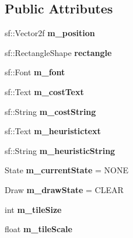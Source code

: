 \subsection*{Public Attributes}
\begin{DoxyCompactItemize}
\item 
\mbox{\label{class_tile_a5d125877d1ef0ee7618b3503db6a77e2}} 
sf\+::\+Vector2f {\bfseries m\+\_\+position}
\item 
\mbox{\label{class_tile_af967570561ac98a4ecf9d7032d709637}} 
sf\+::\+Rectangle\+Shape {\bfseries rectangle}
\item 
\mbox{\label{class_tile_a774c0efbed55d7d09bd5aeaca12836c1}} 
sf\+::\+Font {\bfseries m\+\_\+font}
\item 
\mbox{\label{class_tile_aa8a17967f5bf44cf350ada514a22de75}} 
sf\+::\+Text {\bfseries m\+\_\+cost\+Text}
\item 
\mbox{\label{class_tile_ab83a1b995bcee15701170329b8a96a7f}} 
sf\+::\+String {\bfseries m\+\_\+cost\+String}
\item 
\mbox{\label{class_tile_afff1e69b60047374a446da3e779e66c8}} 
sf\+::\+Text {\bfseries m\+\_\+heuristictext}
\item 
\mbox{\label{class_tile_a861685575cb4c0e107064ba91f336d03}} 
sf\+::\+String {\bfseries m\+\_\+heuristic\+String}
\item 
\mbox{\label{class_tile_a29e483115eaa7cac4d78504d51ea2de5}} 
State {\bfseries m\+\_\+current\+State} = N\+O\+NE
\item 
\mbox{\label{class_tile_a1ffe241b0545ed4be103b7780e6169d7}} 
Draw {\bfseries m\+\_\+draw\+State} = C\+L\+E\+AR
\item 
\mbox{\label{class_tile_a831fdebf7692edc6d6d716fb1dd0dc1b}} 
int {\bfseries m\+\_\+tile\+Size}
\item 
\mbox{\label{class_tile_a5394a4e1ecf07f939e0c4b775f7b0a2c}} 
float {\bfseries m\+\_\+tile\+Scale}
\item 

\end{DoxyCompactItemize}
